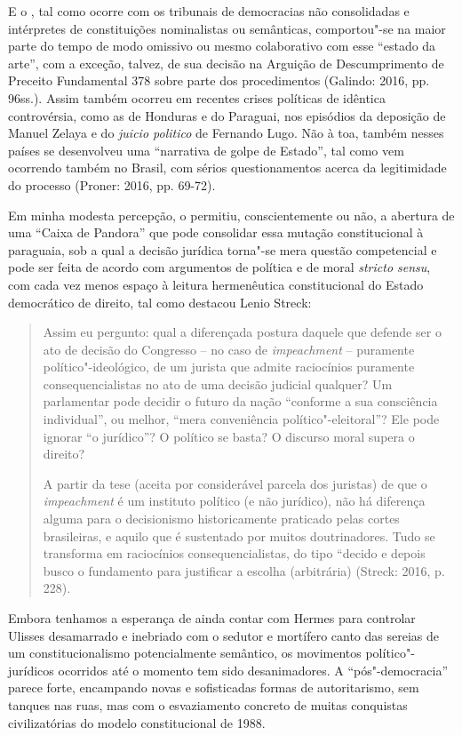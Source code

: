 E o , tal como ocorre com os tribunais de democracias não
consolidadas e intérpretes de constituições nominalistas ou semânticas,
comportou"-se na maior parte do tempo de modo omissivo ou mesmo
colaborativo com esse ``estado da arte'', com a exceção, talvez, de sua
decisão na Arguição de Descumprimento de Preceito Fundamental 378 sobre
parte dos procedimentos (Galindo: 2016, pp. 96ss.). Assim também ocorreu
em recentes crises políticas de idêntica controvérsia, como as de
Honduras e do Paraguai, nos episódios da deposição de Manuel Zelaya e do
\emph{juicio politico} de Fernando Lugo. Não à toa, também nesses países
se desenvolveu uma ``narrativa de golpe de Estado'', tal como vem
ocorrendo também no Brasil, com sérios questionamentos acerca da
legitimidade do processo (Proner: 2016, pp. 69-72).

Em minha modesta percepção, o  permitiu, conscientemente ou não, a
abertura de uma ``Caixa de Pandora'' que pode consolidar essa mutação
constitucional à paraguaia, sob a qual a decisão jurídica torna"-se mera
questão competencial e pode ser feita de acordo com argumentos de
política e de moral \emph{stricto sensu}, com cada vez menos espaço à
leitura hermenêutica constitucional do Estado democrático de direito,
tal como destacou Lenio Streck:

\begin{quote}
Assim eu pergunto: qual a diferençada postura daquele que defende ser o
ato de decisão do Congresso -- no caso de \emph{impeachment} --
puramente político"-ideológico, de um jurista que admite raciocínios
puramente consequencialistas no ato de uma decisão judicial qualquer? Um
parlamentar pode decidir o futuro da nação ``conforme a sua consciência
individual'', ou melhor, ``mera conveniência político"-eleitoral''? Ele
pode ignorar ``o jurídico''? O político se basta? O discurso moral
supera o direito?

A partir da tese (aceita por considerável parcela dos juristas) de que o
\emph{impeachment} é um instituto político (e não jurídico), não há
diferença alguma para o decisionismo historicamente praticado pelas
cortes brasileiras, e aquilo que é sustentado por muitos doutrinadores.
Tudo se transforma em raciocínios consequencialistas, do tipo ``decido e
depois busco o fundamento para justificar a escolha (arbitrária)
(Streck: 2016, p. 228).
\end{quote}

Embora tenhamos a esperança de ainda contar com Hermes para controlar
Ulisses desamarrado e inebriado com o sedutor e mortífero canto das
sereias de um constitucionalismo potencialmente semântico, os movimentos
político"-jurídicos ocorridos até o momento tem sido desanimadores. A
``pós"-democracia'' parece forte, encampando novas e sofisticadas formas
de autoritarismo, sem tanques nas ruas, mas com o esvaziamento concreto
de muitas conquistas civilizatórias do modelo constitucional de 1988.

